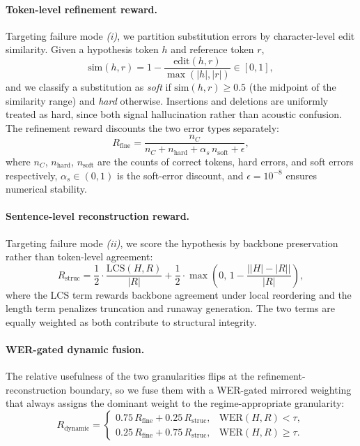 \documentclass{article}
\begin{document}
\vspace{-1mm}
\paragraph{Token-level refinement reward.} Targeting failure mode \textit{(i)}, we partition substitution errors by character-level edit similarity. Given a hypothesis token $h$ and reference token $r$,
\begin{equation}
\text{sim}(h,r) = 1 - \frac{\text{edit}(h,r)}{\max(|h|,|r|)} \in [0,1],
\end{equation}
and we classify a substitution as \textit{soft} if $\text{sim}(h,r) \geq 0.5$ (the midpoint of the similarity range) and \textit{hard} otherwise. Insertions and deletions are uniformly treated as hard, since both signal hallucination rather than acoustic confusion. The refinement reward discounts the two error types separately:
\begin{equation}
R_\text{fine} = \frac{n_C}{n_C + n_\text{hard} + \alpha_s\, n_\text{soft} + \epsilon},
\end{equation}
where $n_C$, $n_\text{hard}$, $n_\text{soft}$ are the counts of correct tokens, hard errors, and soft errors respectively, $\alpha_s \in (0,1)$ is the soft-error discount, and $\epsilon = 10^{-8}$ ensures numerical stability.

\vspace{-1mm}
\paragraph{Sentence-level reconstruction reward.} Targeting failure mode \textit{(ii)}, we score the hypothesis by backbone preservation rather than token-level agreement:
\begin{equation}
R_\text{struc} = \frac{1}{2} \cdot \frac{\text{LCS}(H,R)}{|R|} + \frac{1}{2} \cdot \max\!\left(0,\, 1 - \frac{\big||H|-|R|\big|}{|R|}\right),
\end{equation}
where the LCS term rewards backbone agreement under local reordering and the length term penalizes truncation and runaway generation. The two terms are equally weighted as both contribute to structural integrity.

\vspace{-1mm}
\paragraph{WER-gated dynamic fusion.} The relative usefulness of the two granularities flips at the refinement-reconstruction boundary, so we fuse them with a WER-gated mirrored weighting that always assigns the dominant weight to the regime-appropriate granularity:
\begin{equation}
R_\text{dynamic} =
\begin{cases}
0.75\, R_\text{fine} + 0.25\, R_\text{struc}, & \text{WER}(H,R) < \tau, \\[2pt]
0.25\, R_\text{fine} + 0.75\, R_\text{struc}, & \text{WER}(H,R) \geq \tau.
\end{cases}
\end{equation}
\end{document}
